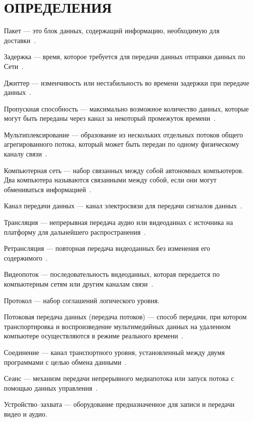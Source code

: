 \chapter*{ОПРЕДЕЛЕНИЯ}

\begin{description}[leftmargin=0pt]
	\item Пакет --- это блок данных, содержащий информацию, необходимую для доставки~\cite{tcp_ip_reilly}.
	\item Задержка --- время, которое требуется для передачи данных отправки данных по Сети~\cite{tcp_ip_reilly}. 
	\item Джиттер --- изменчивость или нестабильность во времени задержки при передаче данных~\cite{tcp_ip_reilly}.
	\item Пропускная способность --- максимально возможное количество данных, которые могут быть переданы через канал за некоторый промежуток времени~\cite{tcp_ip_reilly}.
	\item Мультиплексирование  --- образование из нескольких отдельных потоков общего агрегированного потока, который может быть передан по одному физическому каналу связи~\cite{tcp_ip_lora}.
	\item Компьютерная сеть --- набор связанных между собой автономных компьютеров. Два компьютера называются связанными между собой, если они могут обмениваться информацией~\cite{network_tanenbaum}.
	\item Канал передачи данных --- канал электросвязи для передачи сигналов данных~\cite{network_tanenbaum}.
	\item Трансляция  --- непрерывная передача аудио или видеоданнах с источника на платформу для дальнейшего распространения~\cite{basic_stream_protocls}.
	\item Ретрансляция --- повторная передача видеоданных без изменения его содержимого~\cite{basic_stream_protocls}.
	\item Видеопоток --- последовательность видеоданных, которая передается по компьютерным сетям или другим каналам связи~\cite{basic_stream_protocls}.
	\item Протокол --- набор соглашений логического уровня.
	\item Потоковая передача данных (передача потоков) --- способ передачи, при котором транспортировка и воспроизведение мультимедийных данных на удаленном компьютере осуществляются в режиме реального времени~\cite{basic_stream_protocls}. 
	\item Соединение --- канал транспортного уровня, установленный между двумя программами с целью обмена данными~\cite{rfc_rtsp}.
	\item Сеанс --- механизм передачи непрерывного медиапотока или запуск потока с помощью данных управления~\cite{rfc_rtsp}.
	\item Устройство--захвата --- оборудование предназначенное для записи и передачи видео и аудио.
\end{description}

